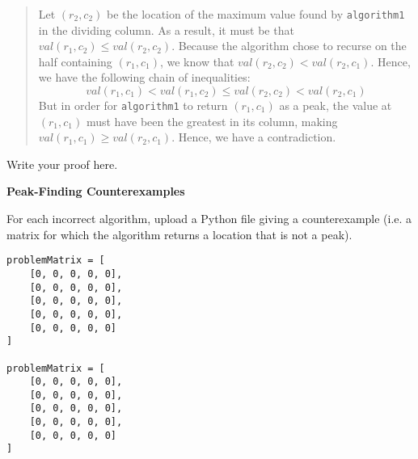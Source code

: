 \documentclass[12pt,twoside]{article}
\begin{document}
\begin{exercises}
\begin{quote}
Let $(r_2, c_2)$ be
the location of the maximum value found by \texttt{algorithm1}
in the dividing column.
As a result, it must be that $val(r_1, c_2) \le val(r_2, c_2)$.
Because the algorithm chose to recurse
on the half containing $(r_1, c_1)$,
we know that $val(r_2, c_2) < val(r_2, c_1)$.
Hence, we have the following chain of inequalities:
$$val(r_1, c_1) < val(r_1, c_2) \le val(r_2, c_2) < val(r_2, c_1)$$
But in order for \texttt{algorithm1} to return $(r_1, c_1)$ as a peak,
the value at $(r_1, c_1)$ must have been the greatest in its column,
making $val(r_1, c_1) \ge val(r_2, c_1)$.
Hence, we have a contradiction.
\end{quote}

\ifsolution \solution{}
Write your proof here.
\fi

\problem {} \textbf{Peak-Finding Counterexamples}

For each incorrect algorithm,
upload a Python file giving a counterexample
(i.e. a matrix for which the algorithm returns a location
that is not a peak).

\ifsolution \solution{}
\begin{verbatim}
problemMatrix = [
    [0, 0, 0, 0, 0],
    [0, 0, 0, 0, 0],
    [0, 0, 0, 0, 0],
    [0, 0, 0, 0, 0],
    [0, 0, 0, 0, 0]
]

problemMatrix = [
    [0, 0, 0, 0, 0],
    [0, 0, 0, 0, 0],
    [0, 0, 0, 0, 0],
    [0, 0, 0, 0, 0],
    [0, 0, 0, 0, 0]
]
\end{verbatim}
\fi

\end{exercises}
\end{document}
